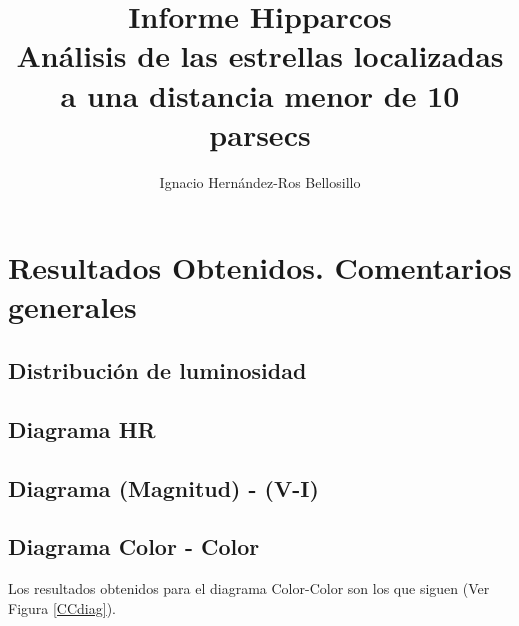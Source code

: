 \documentclass[a4paper]{article}
\title{
\vspace{-3ex}Informe Hipparcos\\
\vspace{1ex}
\large An\'{a}lisis de las estrellas localizadas a una distancia menor de 10 parsecs}
\author{Ignacio Hern\'{a}ndez-Ros Bellosillo}
\date{\vspace{-1ex}}
\begin{document}
\maketitle

\section{Resultados Obtenidos. Comentarios generales}

	

	\subsection{Distribuci\'{o}n de luminosidad}
	
		

	\subsection{Diagrama HR}

		
	
	\subsection{Diagrama (Magnitud) - (V-I)}

		

	\subsection{Diagrama Color - Color}
\hspace*{12pt} Los resultados obtenidos para el diagrama Color-Color son los que siguen (Ver Figura \ref{CCdiag}).
\end{document}
